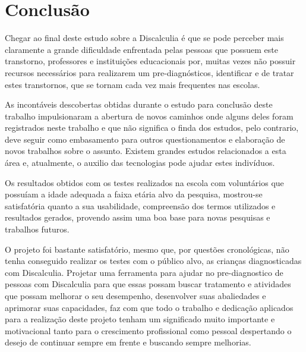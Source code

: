 \documentclass[
	12pt,				%
    oneside,			%
	a4paper,			%
	english,			%
	french,				%
	spanish,			%
	brazil,				%
	]{abntex2}
\begin{document}
\chapter{Conclusão}


Chegar ao final deste estudo sobre a Discalculia é que se pode perceber mais claramente a grande dificuldade enfrentada pelas pessoas que possuem este transtorno, professores e instituições educacionais por, muitas vezes não possuir recursos necessários para realizarem um pre-diagnósticos, identificar e de tratar estes transtornos, que se tornam cada vez mais frequentes nas escolas.

As incontáveis descobertas obtidas durante o estudo para conclusão deste trabalho impulsionaram a abertura de novos caminhos onde alguns deles foram registrados neste trabalho e que não significa o finda dos estudos, pelo contrario, deve seguir como embasamento para outros questionamentos e elaboração de novos trabalhos sobre o assunto. Existem grandes estudos relacionados a esta área e, atualmente, o auxilio das tecnologias pode ajudar estes indivíduos.

Os resultados obtidos com os testes realizados na escola com voluntários que possuíam a idade adequada a faixa etária alvo da pesquisa, mostrou-se satisfatória quanto a sua usabilidade, compreensão dos termos utilizados e resultados gerados, provendo assim uma boa base para novas pesquisas e trabalhos futuros.

O projeto foi bastante satisfatório, mesmo que, por questões cronológicas, não tenha conseguido realizar os testes com o público alvo, as crianças diagnosticadas com Discalculia. Projetar uma ferramenta para ajudar no pre-diagnostico de pessoas com Discalculia para que essas possam buscar tratamento e atividades que possam melhorar o seu desempenho, desenvolver suas abaliedades e aprimorar suas capacidades, faz com que todo o trabalho e dedicação aplicados para a realização deste projeto tenham um significado muito importante e motivacional tanto para o crescimento profissional como pessoal despertando o desejo de continuar sempre em frente e buscando sempre melhorias. 





\postextual


\end{document}
